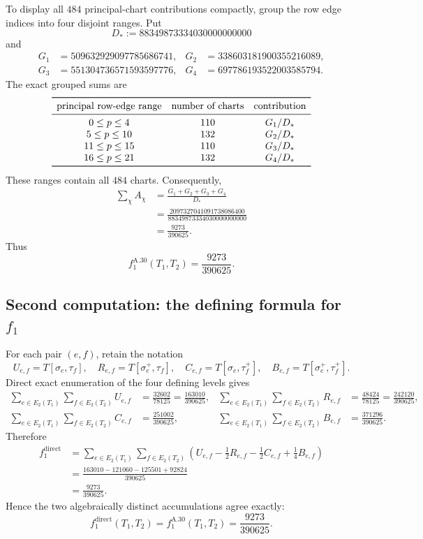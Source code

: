 To display all $484$ principal-chart contributions compactly, group the row
edge indices into four disjoint ranges.  Put
\[
 D_*:=88349873334030000000000
\]
and
\[
\begin{aligned}
G_1&=509632929097785686741,&
G_2&=338603181900355216089,\\
G_3&=551304736571593597776,&
G_4&=697786193522003585794.
\end{aligned}
\]
The exact grouped sums are
\[
\begin{array}{ccc}
\toprule
\text{principal row-edge range}&\text{number of charts}&\text{contribution}\\
\midrule
0\le p\le4&110&G_1/D_*\\
5\le p\le10&132&G_2/D_*\\
11\le p\le15&110&G_3/D_*\\
16\le p\le21&132&G_4/D_*\\
\bottomrule
\end{array}
\]
These ranges contain all $484$ charts.  Consequently,
\[
\begin{aligned}
\sum_\chi A_\chi
&=\frac{G_1+G_2+G_3+G_4}{D_*}\\
&=\frac{2097327041091738086400}{88349873334030000000000}\\
&=\boxed{\frac{9273}{390625}}.
\end{aligned}
\]
Thus
\[
 \boxed{f_1^{\mathrm{A.30}}(T_1,T_2)=\frac{9273}{390625}}.
\]

\subsection[Second computation: the defining formula]
{Second computation: the defining formula for $f_1$}

For each pair $(e,f)$, retain the notation
\[
 U_{e,f}=T[\sigma_e,\tau_f],\quad
 R_{e,f}=T[\sigma_e^+,\tau_f],\quad
 C_{e,f}=T[\sigma_e,\tau_f^+],\quad
 B_{e,f}=T[\sigma_e^+,\tau_f^+].
\]
Direct exact enumeration of the four defining levels gives
\[
\begin{aligned}
\sum_{e\in E_2(T_1)}\sum_{f\in E_2(T_2)}U_{e,f}
&=\frac{32602}{78125}
                    =\frac{163010}{390625},&
\sum_{e\in E_2(T_1)}\sum_{f\in E_2(T_2)}R_{e,f}
&=\frac{48424}{78125}
                    =\frac{242120}{390625},\\
\sum_{e\in E_2(T_1)}\sum_{f\in E_2(T_2)}C_{e,f}
&=\frac{251002}{390625},&
\sum_{e\in E_2(T_1)}\sum_{f\in E_2(T_2)}B_{e,f}
&=\frac{371296}{390625}.
\end{aligned}
\]
Therefore
\[
\begin{aligned}
f_1^{\mathrm{direct}}
&=\sum_{e\in E_2(T_1)}\sum_{f\in E_2(T_2)}\left(
U_{e,f}-\frac12R_{e,f}-\frac12C_{e,f}+\frac14B_{e,f}
\right)\\
&=\frac{163010-121060-125501+92824}{390625}\\
&=\boxed{\frac{9273}{390625}}.
\end{aligned}
\]
Hence the two algebraically distinct accumulations agree exactly:
\[
\boxed{
f_1^{\mathrm{direct}}(T_1,T_2)
=f_1^{\mathrm{A.30}}(T_1,T_2)
=\frac{9273}{390625}}.
\]

